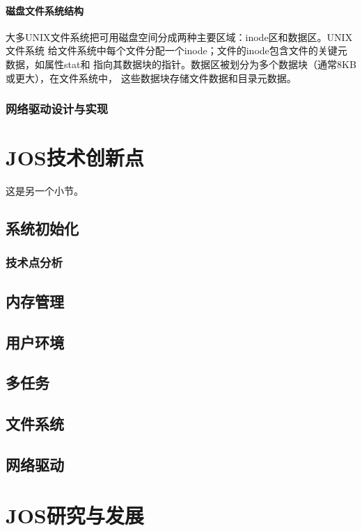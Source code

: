 \documentclass[12pt,openany,a4paper]{report}
\begin{document}
	\paragraph{磁盘文件系统结构}
	   大多UNIX文件系统把可用磁盘空间分成两种主要区域：inode区和数据区。UNIX文件系统
	给文件系统中每个文件分配一个inode；文件的inode包含文件的关键元数据，如属性stat和
	指向其数据块的指针。数据区被划分为多个数据块（通常8KB或更大），在文件系统中，
	这些数据块存储文件数据和目录元数据。\par	
			\subsubsection{网络驱动设计与实现}

	\section{JOS技术创新点}
	这是另一个小节。
		\subsection{系统初始化}
			\subsubsection{技术点分析}
		\subsection{内存管理}
	        \subsection{用户环境} 
	        \subsection{多任务}
	        \subsection{文件系统}
	        \subsection{网络驱动}

	\section{JOS研究与发展}
\end{document}
